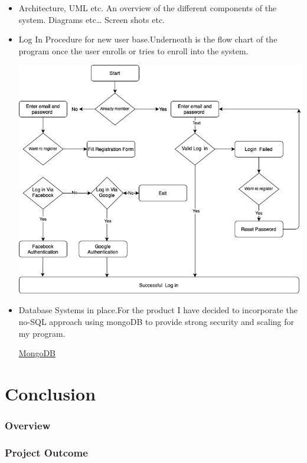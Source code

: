 \begin{itemize}
\item Architecture, UML etc. An overview of the different components of the system. Diagrams etc… Screen shots etc.




\item Log In Procedure for new user base.Underneath is the flow chart of the program once the user enrolls or tries to enroll into the system.


{\includegraphics[width=1.0\textwidth]{final-year-project-template-master/img/Flowchart.jpg}}



\item Database Systems in place.For the product I have decided to incorporate the no-SQL approach using mongoDB to provide strong security and scaling for my program.

\href{https://medium.com/@rsk.saikrishna/when-to-use-mongodb-rather-than-mysql-d03ceff2e922}{MongoDB} 

\end{itemize}


\chapter{Conclusion}

\subsection{Overview}
\subsection{Project Outcome}

